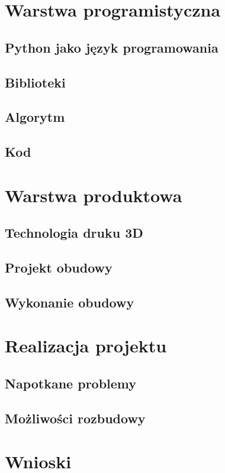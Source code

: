 \documentclass[a4paper,12pt,reqno]{article}
\begin{document}
\newpage
\section{Warstwa programistyczna}
\subsection{Python jako język programowania}
\subsection{Biblioteki}
\subsection{Algorytm}
\subsection{Kod}

\newpage
\section{Warstwa produktowa}
\subsection{Technologia druku 3D}
\subsection{Projekt obudowy}
\subsection{Wykonanie obudowy}

\newpage
\section{Realizacja projektu}
\subsection{Napotkane problemy}
\subsection{Możliwości rozbudowy}

\newpage
\section{Wnioski}
\end{document}
